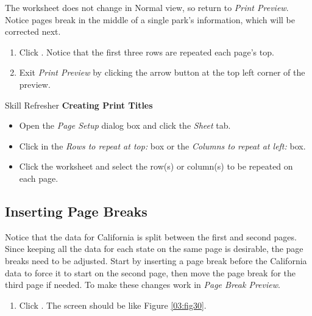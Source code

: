 The worksheet does not change in Normal view, so return to \textit{Print Preview}. Notice pages break in the middle of a single park's information, which will be corrected next.

\begin{enumbox}
	\begin{enumerate}
		\item Click . Notice that the first three rows are repeated each page's top.
		\item Exit \textit{Print Preview} by clicking the arrow button at the top left corner of the preview.
	\end{enumerate}
\end{enumbox}

\begin{center}
	\begin{sklbox}{Skill Refresher}
		\textbf{Creating Print Titles}
		\\
		\begin{itemize}
			\setlength{\itemsep}{0pt}
			\setlength{\parskip}{0pt}
			\setlength{\parsep}{0pt}

			\item Open the \textit{Page Setup} dialog box and click the \textit{Sheet} tab.
			\item Click in the \textit{Rows to repeat at top:} box or the \textit{Columns to repeat at left:} box.
			\item Click the worksheet and select the row(s) or column(s) to be repeated on each page.
						
		\end{itemize}
	\end{sklbox}
\end{center}

\subsection{Inserting Page Breaks}

Notice that the data for California is split between the first and second pages. Since keeping all the data for each state on the same page is desirable, the page breaks need to be adjusted. Start by inserting a page break before the California data to force it to start on the second page, then move the page break for the third page if needed. To make these changes work in \textit{Page Break Preview}.

\begin{enumbox}
	\begin{enumerate}
		\item Click . The screen should be like Figure \ref{03:fig30}.
	\end{enumerate}
\end{enumbox}
	
